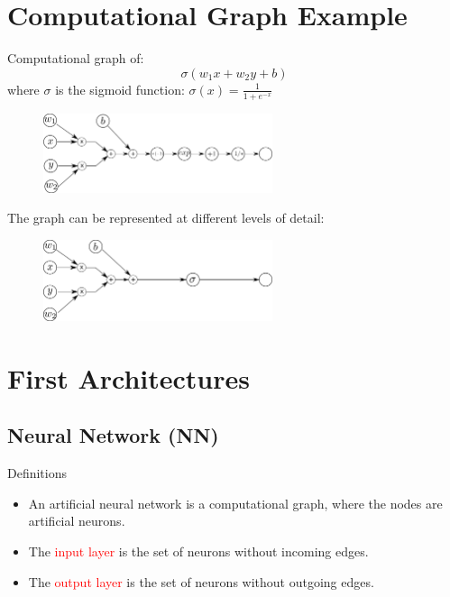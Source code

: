 \documentclass{book}
\newcommand{\alert}[1]{\textcolor{red}{#1}}
\begin{document}
\section{Computational Graph Example}

Computational graph of:
\[
\sigma(w_1x + w_2y + b)
\]
where $\sigma$ is the sigmoid function: $\sigma(x) = \frac{1}{1 + e^{-x}}$

\begin{figure}[h]
    \centering
    \includegraphics[width=0.6\textwidth]{comp_graph2}
\end{figure}

The graph can be represented at different levels of detail:
\begin{figure}[h]
    \centering
    \includegraphics[width=0.6\textwidth]{comp_graph}
\end{figure}

\section{First Architectures}

\subsection{Neural Network (NN)}

\begin{myblock}{Definitions}
\begin{itemize}
\item An artificial neural network is a computational graph, where the nodes are artificial neurons.
\item The \alert{input layer} is the set of neurons without incoming edges.
\item The \alert{output layer} is the set of neurons without outgoing edges.
\end{itemize}
\end{myblock}
\end{document}
